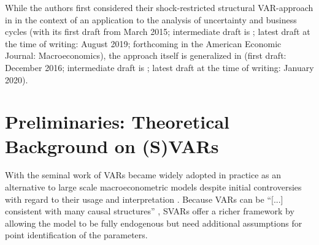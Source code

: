 \documentclass[a4paper,11pt,listof=nochaptergap,oneside,pointednumbers,bibtotoc,bigheadings,liststotoc,hidelinks]{scrbook}
\theoremstyle{mysatz}
\theoremstyle{mydefinition}
\theoremstyle{mytheorem}
\theoremstyle{mybemerkung}
\begin{document}
While the authors first considered their shock-restricted structural VAR-approach in \citet{ludvigsonetal:19} in the context of an application to the analysis of uncertainty and business cycles (with its first draft from March 2015; intermediate draft is \citet{ludvigsonetal:18}; latest draft at the time of writing: August 2019; forthcoming in the American Economic Journal: Macroeconomics), the approach itself is generalized in \citet{ludvigsonetal:20a} (first draft: December 2016; intermediate draft is \citet{ludvigsonetal:17}; latest draft at the time of writing: January 2020).

\section[Preliminaries: Theoretical Background on (S)VARs]{Preliminaries: Theoretical Background on (S)VARs}
With the seminal work of \citet{sims:80} VARs became widely adopted in practice as an alternative to large scale macroeconometric models despite initial controversies with regard to their usage and interpretation \citep{canova:95, canova:95b}. Because VARs can be ``[...] consistent with many causal structures'' \citep[p. 1]{ludvigsonetal:20a}, SVARs offer a richer framework by allowing the model to be fully endogenous but need additional assumptions for point identification of the parameters.

\label{sec:TheoreticalBackgroundSVARs}
\end{document}
